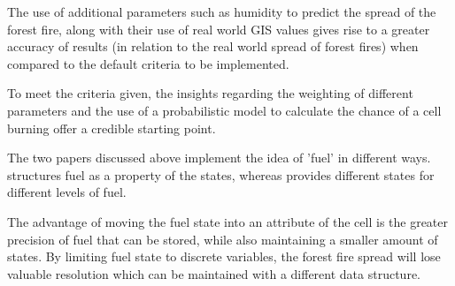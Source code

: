 \documentclass[11pt, a4paper, titlepage]{article}
\begin{document}
  
    

  
  
  
  
  

  The use of additional parameters such as humidity to predict the spread of the forest fire, along with their use of real world GIS values gives rise to a greater accuracy of results (in relation to the real world spread of forest fires) when compared to the default criteria to be implemented.

  To meet the criteria given, the insights regarding the weighting of different parameters and the use of a probabilistic model to calculate the chance of a cell burning offer a credible starting point.

  The two papers discussed above implement the idea of 'fuel' in different ways. \cite{ALEXANDRIDIS2008191} structures fuel as a property of the states, whereas \cite{HERNANDEZENCINAS20071213} provides different states for different levels of fuel. 
  
  The advantage of moving the fuel state into an attribute of the cell is the greater precision of fuel that can be stored, while also maintaining a smaller amount of states. By limiting fuel state to discrete variables, the forest fire spread will lose valuable resolution which can be maintained with a different data structure.
\end{document}
